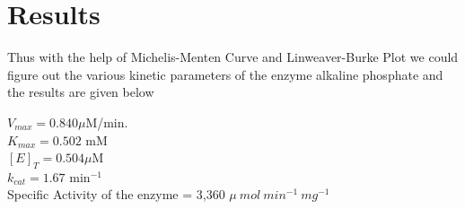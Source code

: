 \documentclass[12pt]{article}
\theoremstyle{definition}
\theoremstyle{definition}
\theoremstyle{remark}
\begin{document}
\section{Results}
Thus with the help of Michelis-Menten Curve and Linweaver-Burke Plot we could figure out the various kinetic parameters of the enzyme alkaline phosphate and the results are given below
\begin{center}
$V_{max}=0.840 \mu $M/min. \\

$K_{max}=0.502$ mM\\


$[E]_{T}= 0.504  \mu$M \\

$k_{cat}=1.67 $  min$^{-1}$\\

Specific Activity of the enzyme =  3,360 $\mu ~mol~ min^{-1}~mg^{-1}$
\end{center}
\end{document}
